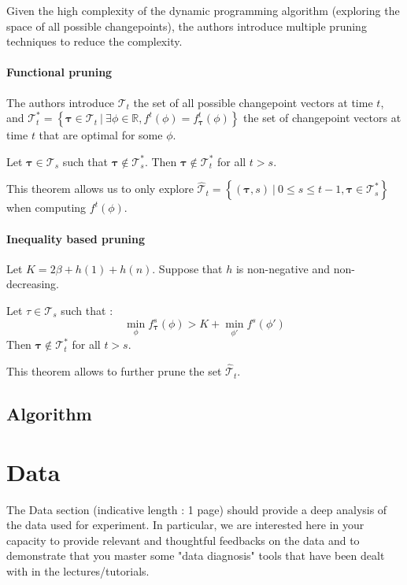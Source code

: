 \documentclass[11pt]{article}
\begin{document}
Given the high complexity of the dynamic programming algorithm (exploring the space of all possible changepoints), the authors introduce multiple pruning techniques to reduce the complexity.

\paragraph*{Functional pruning} The authors introduce $\mathcal{T}_t$ the set of all possible changepoint vectors at time $t$, and $\mathcal{T}_t^*=\left\{\boldsymbol{\tau}\in \mathcal{T}_t \:\big|\: \exists\phi\in\mathbb{R}, f^t(\phi)=f_{\boldsymbol{\tau}}^t(\phi)\right\}$ the set of changepoint vectors at time $t$ that are optimal for some $\phi$.

\begin{theorem}
    \label{th:functional_pruning}
    Let $\boldsymbol{\tau}\in\mathcal{T}_s$ such that $\boldsymbol{\tau}\notin \mathcal{T}_s^*$. Then $\boldsymbol{\tau}\notin \mathcal{T}_t^*$ for all $t>s$.
\end{theorem}

This theorem allows us to only explore $\hat{\mathcal{T}}_t=\left\{(\boldsymbol{\tau},s)\:\big|\: 0\leq s\leq t-1, \boldsymbol{\tau}\in \mathcal{T}_s^*\right\}$ when computing $f^t(\phi)$.

\paragraph*{Inequality based pruning} Let $K=2\beta+h(1)+h(n)$. Suppose that $h$ is non-negative and non-decreasing.

\begin{theorem}
    Let $\tau\in\mathcal{T}_s$ such that :
    $$\min_\phi f_{\boldsymbol{\tau}}^s(\phi) > K + \min_{\phi'} f^s(\phi')$$
    Then $\boldsymbol{\tau}\notin \mathcal{T}_t^*$ for all $t>s$.
\end{theorem}

This theorem allows to further prune the set $\hat{\mathcal{T}}_t$.

\subsection{Algorithm}



\section{Data}
The Data section (indicative length : 1 page) should provide a deep analysis of the data used for experiment. In particular, we are interested here in your capacity to provide relevant and thoughtful feedbacks on the data and to demonstrate that you master some "data diagnosis" tools that have been dealt with in the lectures/tutorials.
\end{document}
